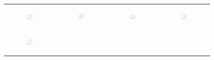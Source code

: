 \begin{figure}[ht]
\begin{tabular}{cccc}
\begin{subfigure}[b]{0.22\textwidth}
	  	\includegraphics[width=105pt]{images/diffFA_CF2G_friendster10M_setcover.pdf}
			\caption{}
			\label{appfig:diffFA_CF2G_friendster10M_setcover}
	  \end{subfigure} &
	  \begin{subfigure}[b]{0.22\textwidth}
	  	\includegraphics[width=105pt]{images/diffFA_CF2G_arabic2005_setcover.pdf}
			\caption{}
			\label{appfig:diffFA_CF2G_arabic2005_setcover}
	  \end{subfigure} &
	  \begin{subfigure}[b]{0.22\textwidth}
	  	\includegraphics[width=105pt]{images/diffFA_CF2G_uk2005_setcover.pdf}
			\caption{}
			\label{appfig:diffFA_CF2G_uk2005_setcover}
	  \end{subfigure} &
	  \begin{subfigure}[b]{0.22\textwidth}
	  	\includegraphics[width=105pt]{images/diffFA_CF2G_it2004_setcover.pdf}
			\caption{}
			\label{appfig:diffFA_CF2G_it2004_setcover}
	  \end{subfigure} \\
	  \begin{subfigure}[b]{0.22\textwidth}
	  	\includegraphics[width=105pt]{images/validated_CC2G_friendster10M_setcover.pdf}

\end{subfigure}
\end{tabular}
\end{figure}

